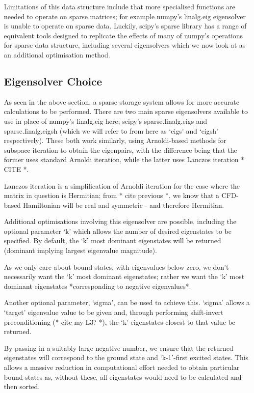 Limitations of this data structure include that more specialised functions are needed to operate on sparse matrices; for example numpy's linalg.eig eigensolver is unable to operate on sparse data. Luckily, scipy's sparse library has a range of equivalent tools designed to replicate the effects of many of numpy's operations for sparse data structure, including several eigensolvers which we now look at as an additional optimisation method.

\subsection{Eigensolver Choice}
As seen in the above section, a sparse storage system allows for more accurate calculations to be performed. There are two main sparse eigensolvers available to use in place of numpy's linalg.eig here; scipy's sparse.linalg.eigs and sparse.linalg.eigsh (which we will refer to from here as `eigs' and `eigsh' respectively). These both work similarly, using Arnoldi-based methods for subspace iteration to obtain the eigenpairs, with the difference being that the former uses standard Arnoldi iteration, while the latter uses Lanczos iteration * CITE *. 

Lanczos iteration is a simplification of Arnoldi iteration for the case where the matrix in question is Hermitian; from * cite previous *, we know that a CFD-based Hamiltonian will be real and symmetric - and therefore Hermitian. 

Additional optimisations involving this eigensolver are possible, including the optional parameter `k' which allows the number of desired eigenstates to be specified. By default, the `k' most dominant eigenstates will be returned (dominant implying largest eigenvalue magnitude). 

As we only care about bound states, with eigenvalues below zero, we don't necessarily want the `k' most dominant eigenstates; rather we want the `k' most dominant eigenstates *corresponding to negative eigenvalues*. 

Another optional parameter, `sigma', can be used to achieve this. `sigma' allows a `target' eigenvalue value to be given and, through performing shift-invert preconditioning (* cite my L3? *), the `k' eigenstates closest to that value be returned. 

By passing in a suitably large negative number, we ensure that the returned eigenstates will correspond to the ground state and `k-1'-first excited states. This allows a massive reduction in computational effort needed to obtain particular bound states as, without these, all eigenstates would need to be calculated and then sorted. 

